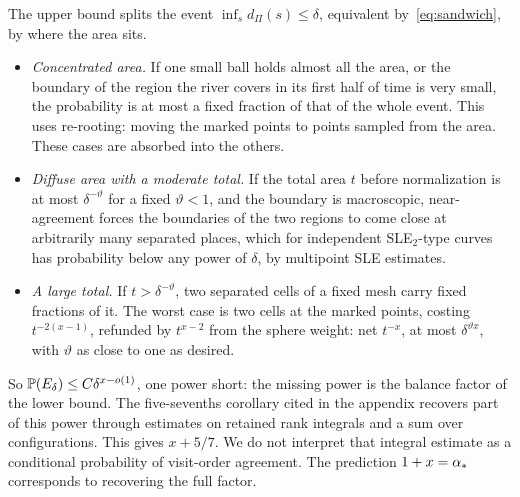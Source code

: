 The upper bound splits the event $\inf_sd_\Pi(s)\le\delta$, equivalent by~\eqref{eq:sandwich},
by where the area sits.
\begin{itemize}
\item \emph{Concentrated area.} If one small ball holds almost all the area, or the boundary of the
region the river covers in its first half of time is very small, the probability is at most a fixed fraction of that of the whole
event. This uses re-rooting: moving the marked points to points sampled from the area. These cases
are absorbed into the others.
\item \emph{Diffuse area with a moderate total.} If the total area $t$ before normalization is at
most $\delta^{-\vartheta}$ for a fixed $\vartheta<1$, and the boundary is macroscopic, near-agreement forces the boundaries of
the two regions to come close at arbitrarily many separated places, which for independent
SLE$_2$-type curves has probability below any power of $\delta$, by multipoint SLE estimates.
\item \emph{A large total.} If $t>\delta^{-\vartheta}$, two separated cells of a fixed mesh carry fixed
fractions of it. The worst case is two cells at the marked points, costing
$t^{-2(x-1)}$, refunded by $t^{x-2}$ from the sphere weight: net $t^{-x}$, at most $\delta^{\vartheta x}$,
with $\vartheta$ as close to one as desired.
\end{itemize}
So $\mathbb{P}(E_\delta)\le C\delta^{x-o(1)}$, one power short: the missing power is the balance factor of
the lower bound. The five-sevenths corollary cited in the appendix recovers part of this power through estimates on
retained rank integrals and a sum over configurations. This gives $x+5/7$. We do not interpret that integral estimate
as a conditional probability of visit-order agreement. The prediction $1+x=\alpha_*$ corresponds to recovering the full factor.
